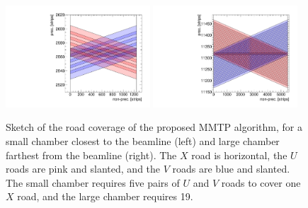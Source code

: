 \begin{figure}[!htpb]
  \begin{center}
    \includegraphics[width=0.48\textwidth]{figures/cartoon_roads_small_smallstereo_N.pdf}
    \includegraphics[width=0.48\textwidth]{figures/cartoon_roads_large_smallstereo_N.pdf}
  \end{center}
  \vspace{-10pt}
  \caption{Sketch of the road coverage of the proposed MMTP algorithm, for a small chamber closest to the beamline (left) and large chamber farthest from the beamline (right). The $X$ road is horizontal, the $U$ roads are pink and slanted, and the $V$ roads are blue and slanted. The small chamber requires five pairs of $U$ and $V$ roads to cover one $X$ road, and the large chamber requires 19.}
  \label{fig:cartoon_smallroads_N}
\end{figure}

